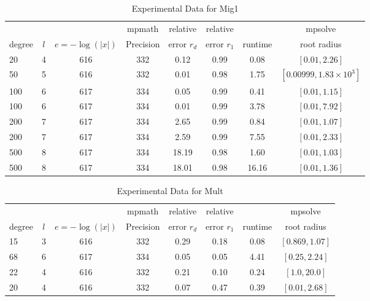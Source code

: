 \documentclass[sigconf]{acmart}
\begin{document}
\begin{table}[t]
\caption{Experimental Data for Mig1}
\label{tab:mig1}
\vskip 0.15in
\begin{center}
\begin{small}
\begin{sc}
\begin{tabular}{lccccccc}
\toprule
&  &  & mpmath & relative  & relative &  & mpsolve \\
degree  & $l$& $e=-\log(|x|)$& Precision &error $r_d$       & error $r_1$ &runtime& root radius\\
\midrule
   20 & 4 & 616 & 332 & 0.12 & 0.99 & 0.08 & $[0.01, 2.26]$ \\
   50 & 5 & 616 & 332 & 0.01 & 0.98 & 1.75 & $[0.00999,1.83 \times 10^{3}]$\\
 100 & 6 & 617 & 334 & 0.05 & 0.99 & 0.41 & $[0.01,1.15]$\\ %
 100 & 6 & 617 & 334 & 0.01 & 0.99 & 3.78 & $[0.01,7.92]$\\ %
 200 & 7 & 617 & 334 & 2.65 & 0.99 & 0.84 & $[0.01,1.07]$\\%
 200 & 7 & 617 & 334 & 2.59 & 0.99 & 7.55 & $[0.01, 2.33]$\\%
 500 & 8 & 617 & 334 & 18.19 & 0.98 & 1.60 & $[0.01, 1.03]$\\ 
 500 & 8 & 617 & 334 & 18.01 & 0.98 & 16.16 & $[0.01,1.36]$\\ %
\bottomrule
\end{tabular}
\end{sc}
\end{small}
\end{center}
\vskip -0.1in
\end{table}


\begin{table}[t]
\caption{Experimental Data for Mult}
\label{tab:mult}
\vskip 0.15in
\begin{center}
\begin{small}
\begin{sc}
\begin{tabular}{lccccccc}
\toprule
&  &  & mpmath & relative  & relative &  & mpsolve \\
degree  & $l$& $e=-\log(|x|)$& Precision &error $r_d$       & error $r_1$ &runtime& root radius\\
\midrule
   15 & 3 & 616 & 332 & 0.29 & 0.18 & 0.08 & $[0.869,1.07]$ \\ %
   68 & 6 & 617 & 334 & 0.05 & 0.05 & 4.41 & $[0.25,2.24]$\\ %
   22 & 4 & 616 & 332 & 0.21 & 0.10 & 0.24 & $[1.0, 20.0]$\\ %
   20 & 4 & 616 & 332 & 0.07 & 0.47 & 0.39 & $[0.01, 2.68]$\\ %
\bottomrule
\end{tabular}
\end{sc}
\end{small}
\end{center}
\vskip -0.1in
\end{table}
\end{document}
